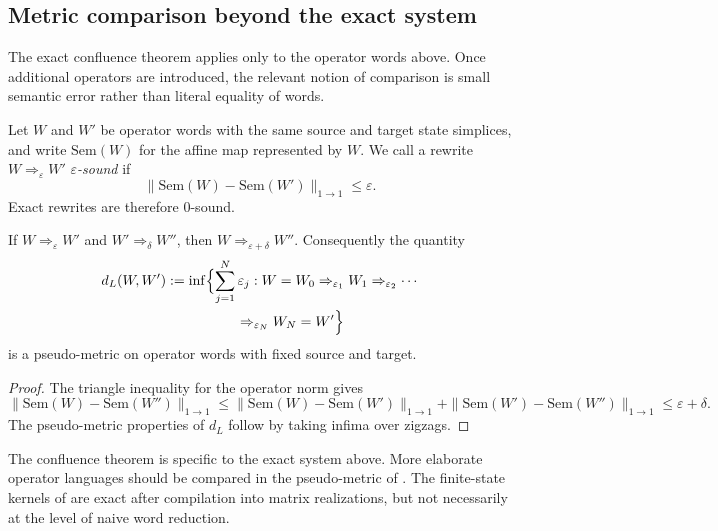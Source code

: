 \subsection{Metric comparison beyond the exact system}

The exact confluence theorem applies only to the operator words above.  Once
additional operators are introduced, the relevant notion of comparison is small
semantic error rather than literal equality of words.

\begin{definition}
\label{def:epsilon-sound}
Let \(W\) and \(W'\) be operator words with the same source and target state
simplices, and write \(\mathrm{Sem}(W)\) for the affine map represented by
\(W\).  We call a rewrite \(W\Rightarrow_{\varepsilon} W'\)
\emph{\(\varepsilon\)-sound} if
\[
  \|\mathrm{Sem}(W)-\mathrm{Sem}(W')\|_{1\to 1}\le \varepsilon.
\]
Exact rewrites are therefore \(0\)-sound.
\end{definition}

\begin{proposition}
\label{prop:lawvere-distance}
If \(W\Rightarrow_{\varepsilon} W'\) and \(W'\Rightarrow_{\delta} W''\), then
\(W\Rightarrow_{\varepsilon+\delta} W''\).  Consequently the quantity
\[
  \begin{aligned}
  d_L(W,W')
  &:=\inf\Bigl\{\sum_{j=1}^N \varepsilon_j:
  W=W_0\Rightarrow_{\varepsilon_1}W_1\Rightarrow_{\varepsilon_2}\cdots \\
  &\hspace{5em}
  \Rightarrow_{\varepsilon_N}W_N=W'\Bigr\}
  \end{aligned}
\]
is a pseudo-metric on operator words with fixed source and target.
\end{proposition}

\begin{proof}
The triangle inequality for the operator norm gives
\[
  \|\mathrm{Sem}(W)-\mathrm{Sem}(W'')\|_{1\to1}
  \le
  \|\mathrm{Sem}(W)-\mathrm{Sem}(W')\|_{1\to1}
  +
  \|\mathrm{Sem}(W')-\mathrm{Sem}(W'')\|_{1\to1}
  \le \varepsilon+\delta.
\]
The pseudo-metric properties of \(d_L\) follow by taking infima over zigzags.
\end{proof}

\begin{remark}
\label{rem:rewrite-boundary}
The confluence theorem is specific to the exact system above.  More elaborate
operator languages should be compared in the pseudo-metric of
.  The finite-state kernels of
 are exact after compilation into matrix realizations,
but not necessarily at the level of naive word reduction.
\end{remark}
